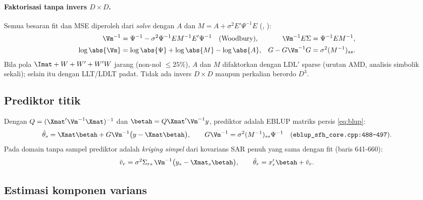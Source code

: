 \paragraph{Faktorisasi tanpa invers $D\times D$.} Semua besaran fit dan MSE
diperoleh dari \emph{solve} dengan $A$ dan
$M=A+\sigma^2E'\Psi^{-1}E$ (,
):
\begin{equation}
\begin{aligned}
  \Vm^{-1}&=\Psi^{-1}-\sigma^2\Psi^{-1}EM^{-1}E'\Psi^{-1}\quad\text{(Woodbury)},&
  \Vm^{-1}E\Sigma&=\Psi^{-1}EM^{-1},\\
  \log\abs{\Vm}&=\log\abs{\Psi}+\log\abs{M}-\log\abs{A},&
  G-G\Vm^{-1}G&=\sigma^2(M^{-1})_{ss}.
\end{aligned}
  \label{eq:sfh-engine}
\end{equation}
Bila pola $\Imat+W+W'+W'W$ jarang (non-nol $\le25\%$), $A$ dan $M$
difaktorkan dengan LDL$'$ sparse  (urutan AMD, analisis simbolik
sekali); selain itu dengan LLT/LDLT padat. Tidak ada invers $D\times D$ maupun
perkalian berordo $D^3$.

\subsection{Prediktor titik}\label{sec:sfh-prediktor}

Dengan $Q=(\Xmat'\Vm^{-1}\Xmat)^{-1}$ dan
$\betah=Q\Xmat'\Vm^{-1}y$, prediktor adalah EBLUP matriks persis
\eqref{eq:blup}:
\begin{equation}
  \hat\theta_s=\Xmat\betah+G\Vm^{-1}\bigl(y-\Xmat\betah\bigr),
  \qquad
  G\Vm^{-1}=\sigma^2(M^{-1})_{ss}\Psi^{-1}
  \quad(\texttt{eblup\_sfh\_core.cpp:488-497}).
  \label{eq:sfh-pred}
\end{equation}
Pada domain tanpa sampel prediktor adalah \emph{kriging simpel} dari kovarians
SAR penuh yang sama dengan fit (baris 641-660):
\begin{equation}
  \hat v_{r}=\sigma^2\Sigma_{rs}\,\Vm^{-1}\bigl(y_s-\Xmat_s\betah\bigr),
  \qquad
  \hat\theta_{r}=x_{r}'\betah+\hat v_{r}.
  \label{eq:sfh-kriging}
\end{equation}

\subsection{Estimasi komponen varians}\label{sec:sfh-varians}

